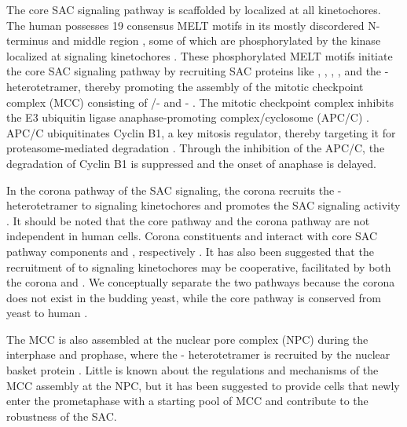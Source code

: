 The core SAC signaling pathway is scaffolded by  localized at all kinetochores. The human  possesses 19 consensus MELT motifs in its mostly discordered N-terminus and middle region \cite{MELTEvolution}, some of which are phosphorylated by the kinase  localized at signaling kinetochores \cite{MPS1-KNL1_London2012, MPS1-KNL1_Shepperd2012, MPS1-KNL1_Yamagishi2012, MPS1Localization_Ji, MPS1Localization_Hiruma}. These phosphorylated MELT motifs initiate the core SAC signaling pathway by recruiting SAC proteins like , , , , and the - heterotetramer, thereby promoting the assembly of the mitotic checkpoint complex (MCC) consisting of /- and - \cite{RecombinantKNL1, MELTActivity, BubBiochem, BubR1TwoPools, BUB1CD1-MAD1CStructure, Faesen2017, BUB1-CDC20-MAD1, Tripartite, SpMCC}. The mitotic checkpoint complex inhibits the E3 ubiquitin ligase anaphase-promoting complex/cyclosome (APC/C) \cite{APC-MCC_Alfieri2016, APC-MCC_Yamaguchi2016}. APC/C ubiquitinates Cyclin B1, a key mitosis regulator, thereby targeting it for proteasome-mediated degradation \cite{CyclinB1Degradation_Clute+Pines1999, CyclinB1Degradation_Chang2003, SeparaseStructure}. Through the inhibition of the APC/C, the degradation of Cyclin B1 is suppressed and the onset of anaphase is delayed.

In the corona pathway of the SAC signaling, the corona recruits the - heterotetramer to signaling kinetochores and promotes the SAC signaling activity \cite{CoronaActivatesSAC}. It should be noted that the core pathway and the corona pathway are not independent in human cells. Corona constituents  and  interact with core SAC pathway components  and , respectively \cite{CENPELocalization-BUBR1, CENP-FLimitsStripping}. It has also been suggested that the recruitment of  to signaling kinetochores may be cooperative, facilitated by both the corona and  \cite{MIS12-CEP57-MAD1-MAD2, siROD_Zhang2019}. We conceptually separate the two pathways because the corona does not exist in the budding yeast, while the core pathway is conserved from yeast to human \cite{YeastNoRZZ}.

The MCC is also assembled at the nuclear pore complex (NPC) during the interphase and prophase, where the - heterotetramer is recruited by the nuclear basket protein  \cite{TPR-MAD1_Lee2008, PremitoticMCC}. Little is known about the regulations and mechanisms of the MCC assembly at the NPC, but it has been suggested to provide cells that newly enter the prometaphase with a starting pool of MCC and contribute to the robustness of the SAC.

